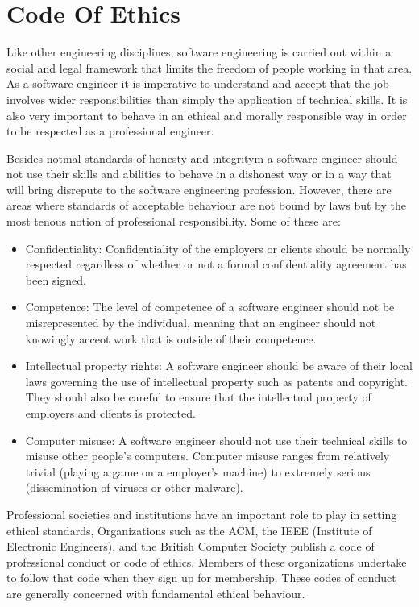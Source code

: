 \chapter{Code Of Ethics}
Like other engineering disciplines, software engineering is carried out within a social and legal framework that limits the freedom of people working in that area. As a software engineer it is imperative to understand and accept that the job involves wider responsibilities than simply the application of technical skills. It is also very important to behave in an ethical and morally responsible way in order to be respected as a professional engineer.

Besides notmal standards of honesty and integritym a software engineer should not use their skills and abilities to behave in a dishonest way or in a way that will bring disrepute to the software engineering profession. However, there are areas where standards of acceptable behaviour are not bound by laws but by the most tenous notion of professional responsibility. Some of these are:
\begin{itemize}
    \item Confidentiality: Confidentiality of the employers or clients should be normally respected regardless  of whether or not a formal confidentiality agreement has been signed.
    \item Competence: The level of competence of a software engineer should not be misrepresented by the individual, meaning that an engineer should not knowingly acceot work that is outside of their competence.
    \item Intellectual property rights: A software engineer should be aware of their local laws governing the use of intellectual property such as patents and copyright. They should also be careful to ensure that the intellectual property of employers and clients is protected.
    \item Computer misuse: A software engineer should not use their technical skills to misuse other people's computers. Computer misuse ranges from relatively trivial (playing a game on a employer's machine) to extremely serious (dissemination of viruses or other malware).
\end{itemize}

Professional societies and institutions have an important role to play in setting ethical standards, Organizations such as the ACM, the IEEE (Institute of Electronic Engineers), and the British Computer Society publish a code of professional conduct or code of ethics. Members of these organizations undertake to follow that code when they sign up for membership. These codes of conduct are generally concerned with fundamental ethical behaviour.

